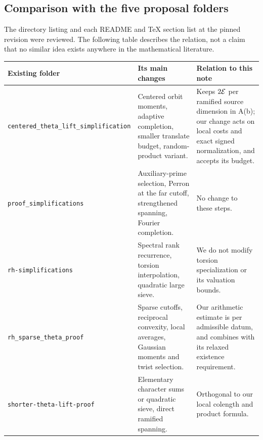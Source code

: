 \documentclass[11pt,letterpaper]{article}
\theoremstyle{remark}\newtheorem{remark}[theorem]{Remark}
\begin{document}
\subsection{Comparison with the five proposal folders}
The directory listing and each README and TeX section list at the pinned revision were reviewed. The following table describes the relation, not a claim that no similar idea exists anywhere in the mathematical literature.
\begin{center}\small
\begin{tabularx}{\linewidth}{@{}p{.28\linewidth}X X@{}}\toprule
Existing folder & Its main changes & Relation to this note\\\midrule
\texttt{centered\_theta\_lift\_}\newline\texttt{simplification} & Centered orbit moments, adaptive completion, smaller translate budget, random-product variant. & Keeps $2\mathcal E$ per ramified source dimension in A(b); our change acts on local costs and exact signed normalization, and accepts its budget.\\
\texttt{proof\_simplifications} & Auxiliary-prime selection, Perron at the far cutoff, strengthened spanning, Fourier completion. & No change to these steps.\\
\texttt{rh-simplifications} & Spectral rank recurrence, torsion interpolation, quadratic large sieve. & We do not modify torsion specialization or its valuation bounds.\\
\texttt{rh\_sparse\_theta\_proof} & Sparse cutoffs, reciprocal convexity, local averages, Gaussian moments and twist selection. & Our arithmetic estimate is per admissible datum, and combines with its relaxed existence requirement.\\
\texttt{shorter-theta-lift-proof} & Elementary character sums or quadratic sieve, direct ramified spanning. & Orthogonal to our local colength and product formula.\\\bottomrule
\end{tabularx}
\end{center}
\end{document}
